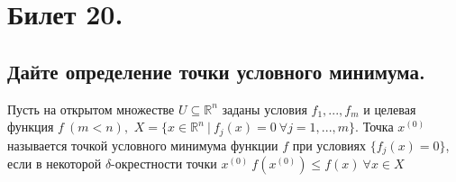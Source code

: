\section{Билет 20.}

\subsection{Дайте определение точки условного минимума.}
\begin{definition}
    Пусть на открытом множестве $U \subseteq \mathbb{R}^n$ заданы условия $f_1, ..., f_m$ и целевая функция $f \> (m < n),$ $X = \{x \in \mathbb{R}^n \> | \> f_j(x) = 0 \> \forall j = 1, ..., m \}$. Точка $x^{(0)}$ называется точкой условного минимума функции $f$ при условиях $\{f_j(x) = 0\}$, если в некоторой $\delta$-окрестности точки $x^{(0)} \> f(x^{(0)}) \leqslant f(x) \> \forall x \in X$
\end{definition}
